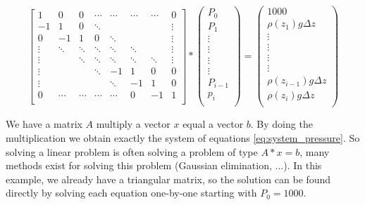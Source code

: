 \begin{equation}
\label{eq:ax_b}
\begin{bmatrix}
   1   &    0   &    0   & \cdots & \cdots & \cdots & \cdots &   0    \\
  -1   &    1   &    0   & \ddots &        &        &        & \vdots \\
   0   &   -1   &    1   &    0   & \ddots &        &        & \vdots \\
\vdots & \ddots & \ddots & \ddots & \ddots & \ddots &        & \vdots \\
\vdots &        & \ddots & \ddots & \ddots & \ddots & \ddots & \vdots \\
\vdots &        &        & \ddots &   -1   &    1   &    0   &   0    \\
\vdots &        &        &        & \ddots &   -1   &    1   &   0    \\
   0   & \cdots & \cdots & \cdots & \cdots &    0   &   -1   &   1    \\
\end{bmatrix}
*
\begin{pmatrix}
  P_0  \\
  P_1  \\
\vdots \\
\vdots \\
\vdots \\
\vdots \\
P_{i-1} \\
  p_i  \\
\end{pmatrix}
=
\begin{pmatrix}
 1000  \\
\rho(z_1)g\Delta{z}     \\
\vdots \\
\vdots \\
\vdots \\
\vdots \\
\rho(z_{i-1})g\Delta{z} \\
\rho(z_i)g\Delta{z}    \\
\end{pmatrix}
\end{equation}


We have a matrix $A$ multiply a vector $x$ equal a vector $b$.
%
By doing the multiplication we obtain exactly the system of equations \ref{eq:system_pressure}.
%
So solving a linear problem is often solving a problem of type $A*x=b$, many methods exist for solving this problem (Gaussian elimination, ...).
%
In this example, we already have a triangular matrix, so the solution can be found directly by solving each equation one-by-one starting with $P_0 = 1000$.


